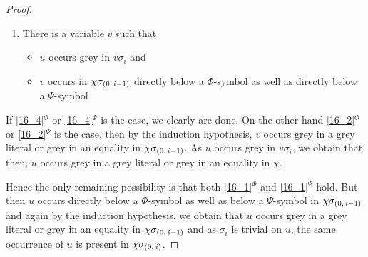 \documentclass[,%
	draft=false,%
	numbers=noendperiod
	12pt,
	a4paper,
	oneside,%
	openany,
]{memoir}
\newcommand{\inv}{\ensuremath{\chi}}
\begin{document}
\begin{proof}
\begin{enumerate}

		\item 
			\label{16_2}
			There is a variable $v$ such that 
			{
				\renewcommand{\labelitemi}{\textendash}
				\begin{itemize}
					\item $u$ occurs grey in $v\sigma_i$ and
					\item $v$ occurs in $\inv\sigmazmi$ directly below a $\Phi$-symbol as well as directly below a $\Psi$-symbol
				\end{itemize}
			}
	\end{enumerate}

	If \ref{16_4}$^\Phi$ or \ref{16_4}$^\Psi$ is the case, we clearly are done.
	On the other hand \ref{16_2}$^\Phi$ or \ref{16_2}$^\Psi$ is the case, then by the induction hypothesis, $v$ occurs grey in a grey literal or grey in an equality in $\inv\sigmazmi$. 
	As $u$ occurs grey in $v\sigma_i$, we obtain that then, $u$ occurs grey in a grey literal or grey in an equality in $\inv$.

	Hence the only remaining possibility is that both \ref{16_1}$^\Phi$
	and \ref{16_1}$^\Psi$ hold.
	But then $u$ occurs directly below a $\Phi$-symbol as well as below a $\Psi$-symbol in $\inv\sigmazmi$ and again by the induction hypothesis, we obtain that $u$ occurs grey in a grey literal or grey in an equality in $\inv\sigmazmi$ and as $\sigma_i$ is trivial on $u$, the same occurrence of $u$ is present in $\inv\sigmazi$.
\end{proof}
\end{document}
